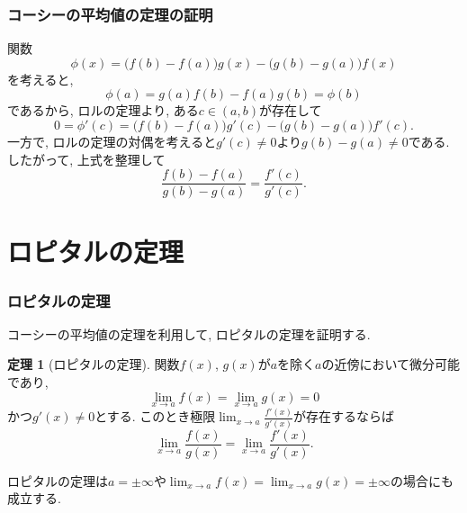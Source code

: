 \documentclass[dvipdfmx,cjk,10.2pt]{beamer}
\theoremstyle{definition}
\newtheorem{Thm}{定理}[section]
\begin{document}



\begin{frame}
\frametitle{コーシーの平均値の定理の証明}

関数
$$
\phi(x)=\big(f(b)-f(a)\big)g(x)-\big(g(b)-g(a)\big)f(x)
$$
を考えると, 
$$
\phi(a)=g(a)f(b)-f(a)g(b)=\phi(b)
$$
であるから, ロルの定理より, ある$c \in (a,b)$が存在して
$$
0=\phi'(c)=\big(f(b)-f(a)\big)g'(c)-\big(g(b)-g(a)\big)f'(c). 
$$
一方で, ロルの定理の対偶を考えると$g'(c)\ne0$より$g(b)-g(a)\ne0$である. 
したがって, 上式を整理して
$$
\frac{f(b)-f(a)}{g(b)-g(a)}=\frac{f'(c)}{g'(c)}. 
$$



\end{frame}



\section{ロピタルの定理}

\begin{frame}
\frametitle{ロピタルの定理}

コーシーの平均値の定理を利用して, ロピタルの定理を証明する. 

\begin{Thm}[ロピタルの定理]
関数$f(x)$, $g(x)$が$a$を除く$a$の近傍において微分可能であり, 
$$
\lim_{x\to a}f(x) = \lim_{x\to a}g(x)=0
$$
かつ$g'(x) \ne0$とする. このとき極限$\displaystyle \lim_{x\to a}\frac{f'(x)}{g'(x)}$が存在するならば
$$
\lim_{x\to a}\frac{f(x)}{g(x)} = \lim_{x\to a}\frac{f'(x)}{g'(x)}. 
$$
\end{Thm}

ロピタルの定理は$a=\pm \infty$や$\displaystyle \lim_{x\to a}f(x) = \lim_{x\to a}g(x)=\pm \infty$の場合にも成立する. 

\end{frame}



\end{document}
